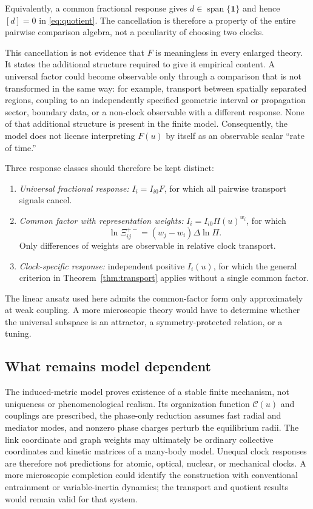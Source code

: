 \documentclass[11pt]{article}
\theoremstyle{plain}
\begin{document}
Equivalently, a common fractional response gives
$d\in\operatorname{span}\{\boldsymbol 1\}$ and hence $[d]=0$ in
\eqref{eq:quotient}.  The cancellation is therefore a property of the entire
pairwise comparison algebra, not a peculiarity of choosing two clocks.

This cancellation is not evidence that $F$ is meaningless in every enlarged theory. It states the additional structure required to give it empirical content. A universal factor could become observable only through a comparison that is not transformed in the same way: for example, transport between spatially separated regions, coupling to an independently specified geometric interval or propagation sector, boundary data, or a non-clock observable with a different response. None of that additional structure is present in the finite model. Consequently, the model does not license interpreting $F(u)$ by itself as an observable scalar ``rate of time.''

Three response classes should therefore be kept distinct:
\begin{enumerate}[leftmargin=2em]
\item \emph{Universal fractional response:} $I_i=I_{i0}F$, for which all
pairwise transport signals cancel.
\item \emph{Common factor with representation weights:} $I_i=I_{i0}\Pi(u)^{w_i}$, for which
\begin{equation}
\ln\Xi_{ij}^{+-}=(w_j-w_i)\Delta\ln\Pi.
\end{equation}
Only differences of weights are observable in relative clock transport.
\item \emph{Clock-specific response:} independent positive $I_i(u)$, for which the general criterion in Theorem~\ref{thm:transport} applies without a single common factor.
\end{enumerate}
The linear ansatz used here admits the common-factor form only approximately at
weak coupling.  A more microscopic theory would have to determine whether the
universal subspace is an attractor, a symmetry-protected relation, or a tuning.

\subsection{What remains model dependent}

The induced-metric model proves existence of a stable finite mechanism, not
uniqueness or phenomenological realism.  Its organization function
$\mathcal C(u)$ and couplings are prescribed, the phase-only reduction assumes
fast radial and mediator modes, and nonzero phase charges perturb the
equilibrium radii.  The link coordinate and graph weights may ultimately be
ordinary collective coordinates and kinetic matrices of a many-body model.
Unequal clock responses are therefore not predictions for atomic, optical,
nuclear, or mechanical clocks.  A more microscopic completion could identify
the construction with conventional entrainment or variable-inertia dynamics;
the transport and quotient results would remain valid for that system.
\end{document}
